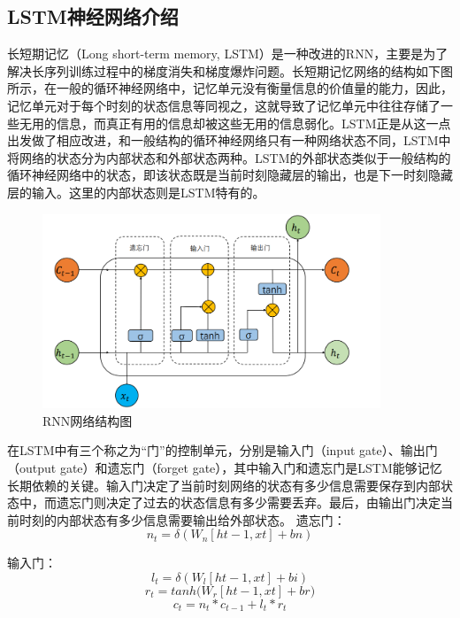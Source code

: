 \documentclass[UTF8]{ctexart}
\begin{document}
\subsection{LSTM神经网络介绍}
长短期记忆（Long short-term memory, LSTM）是一种改进的RNN，主要是为了解决长序列训练过程中的梯度消失和梯度爆炸问题。长短期记忆网络的结构如下图所示，在一般的循环神经网络中，记忆单元没有衡量信息的价值量的能力，因此，记忆单元对于每个时刻的状态信息等同视之，这就导致了记忆单元中往往存储了一些无用的信息，而真正有用的信息却被这些无用的信息弱化。LSTM正是从这一点出发做了相应改进，和一般结构的循环神经网络只有一种网络状态不同，LSTM中将网络的状态分为内部状态和外部状态两种。LSTM的外部状态类似于一般结构的循环神经网络中的状态，即该状态既是当前时刻隐藏层的输出，也是下一时刻隐藏层的输入。这里的内部状态则是LSTM特有的。   
\begin{figure}[H] %
    \centering %
    \includegraphics[width=0.9\textwidth]{./picture/LSTMNetStructural.png} %
    \caption{RNN网络结构图} 
\end{figure}

在LSTM中有三个称之为“门”的控制单元，分别是输入门（input gate）、输出门（output gate）和遗忘门（forget gate），其中输入门和遗忘门是LSTM能够记忆长期依赖的关键。输入门决定了当前时刻网络的状态有多少信息需要保存到内部状态中，而遗忘门则决定了过去的状态信息有多少需要丢弃。最后，由输出门决定当前时刻的内部状态有多少信息需要输出给外部状态。
遗忘门：
\begin{equation}
    n_t=\delta(W_n[ht-1,xt]+bn)
\end{equation}

输入门：
\begin{equation}
    l_t=\delta(W_l[ht-1,xt]+bi)
\end{equation}
\begin{equation}
    r_t=tanh{(}W_r[ht-1,xt]+br)
\end{equation}
\begin{equation}
    c_t=n_t\ast c_{t-1}+l_t*r_t
\end{equation}
\end{document}
